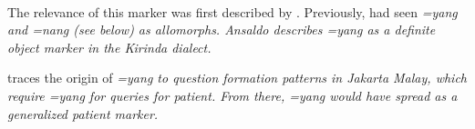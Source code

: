  \\



% 





The relevance of this marker was first described by \citet{Ansaldo2005ms}. Previously,\citep{SmithRH} had seen \em =yang \em and \em =nang \em (see below) as allomorphs.  Ansaldo describes \em =yang \em  as a definite object marker in the Kirinda dialect.


\citet[149]{Slomanson2007cll} traces the origin of \em =yang \em to question formation patterns in Jakarta Malay, which require \em =yang \em for queries for patient. From there, \em =yang \em would have spread as a generalized patient marker.

% 
% 


